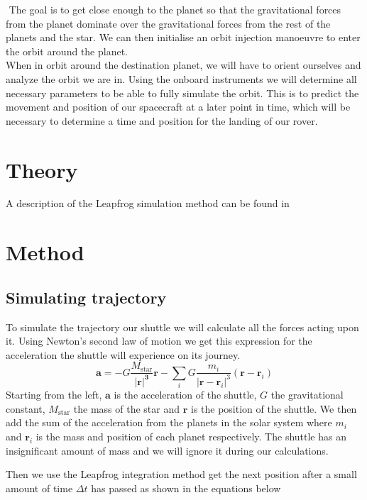 \documentclass[reprint,english,notitlepage]{revtex4-2}
\begin{document}
$  $
The goal is to get close enough to the planet so that the gravitational forces from the planet dominate over the gravitational forces from the rest of the planets and the star.
We can then initialise an orbit injection manoeuvre to enter the orbit around the planet.\\

When in orbit around the destination planet, we will have to orient ourselves and analyze the orbit we are in.
Using the onboard instruments we will determine all necessary parameters to be able to fully simulate the orbit.
This is to predict the movement and position of our spacecraft at a later point in time, which will be necessary to determine a time and position for the landing of our rover.



\section{Theory} \label{sec: theory}
A description of the Leapfrog simulation method can be found in %

\section{Method} \label{sec: method}
\subsection{Simulating trajectory} \label{ssec: simulating trajectory}
To simulate the trajectory our shuttle we will calculate all the forces acting upon it. Using Newton's second law of motion we get this expression for the acceleration the shuttle will experience on its journey. 
\[
\mathbf{a} = - G \frac{M_{\text{star}}}{\mathbf{\left\vert \mathbf{r} \right\vert ^{3}}} \mathbf{r} - \sum_{i} G \frac{m_i}{\left\vert \mathbf{r} - \mathbf{r}_i \right\vert ^{3}} \left( \mathbf{r} - \mathbf{r}_i \right) 
\]
Starting from the left, $ \mathbf{a} $ is the acceleration of the shuttle, $ G $ the gravitational constant, $ M_{\text{star}} $ the mass of the star and $ \mathbf{r} $ is the position of the shuttle. We then add the sum of the acceleration from the planets in the solar system where $ m_i $ and $ \mathbf{r}_i $ is the mass and position of each planet respectively. The shuttle has an insignificant amount of mass and we will ignore it during our calculations. 

Then we use the Leapfrog integration method get the next position after a small amount of time $  Δt  $ has passed as shown in the equations below
\end{document}
